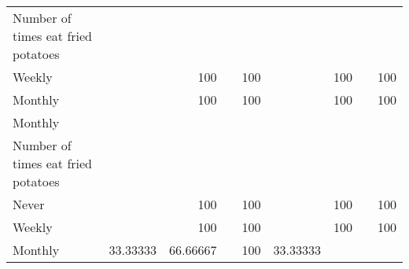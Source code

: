 \documentclass{article}
\begin{document}
\begin{tabular}{lllllllll}
\multicolumn{1}{l}{\hspace{6em}Number of times eat fried potatoes} &
  \multicolumn{1}{|r}{} &
  \multicolumn{1}{r}{} &
  \multicolumn{1}{r}{} &
  \multicolumn{1}{r}{} &
  \multicolumn{1}{r}{} &
  \multicolumn{1}{r}{} &
  \multicolumn{1}{r}{} &
  \multicolumn{1}{r}{} \\
\multicolumn{1}{l}{\hspace{7em}Weekly} &
  \multicolumn{1}{|r}{} &
  \multicolumn{1}{r}{100} &
  \multicolumn{1}{r}{} &
  \multicolumn{1}{r}{100} &
  \multicolumn{1}{r}{} &
  \multicolumn{1}{r}{100} &
  \multicolumn{1}{r}{} &
  \multicolumn{1}{r}{100} \\
\multicolumn{1}{l}{\hspace{7em}Monthly} &
  \multicolumn{1}{|r}{} &
  \multicolumn{1}{r}{100} &
  \multicolumn{1}{r}{} &
  \multicolumn{1}{r}{100} &
  \multicolumn{1}{r}{} &
  \multicolumn{1}{r}{100} &
  \multicolumn{1}{r}{} &
  \multicolumn{1}{r}{100} \\
\multicolumn{1}{l}{\hspace{5em}Monthly} &
  \multicolumn{1}{|r}{} &
  \multicolumn{1}{r}{} &
  \multicolumn{1}{r}{} &
  \multicolumn{1}{r}{} &
  \multicolumn{1}{r}{} &
  \multicolumn{1}{r}{} &
  \multicolumn{1}{r}{} &
  \multicolumn{1}{r}{} \\
\multicolumn{1}{l}{\hspace{6em}Number of times eat fried potatoes} &
  \multicolumn{1}{|r}{} &
  \multicolumn{1}{r}{} &
  \multicolumn{1}{r}{} &
  \multicolumn{1}{r}{} &
  \multicolumn{1}{r}{} &
  \multicolumn{1}{r}{} &
  \multicolumn{1}{r}{} &
  \multicolumn{1}{r}{} \\
\multicolumn{1}{l}{\hspace{7em}Never} &
  \multicolumn{1}{|r}{} &
  \multicolumn{1}{r}{100} &
  \multicolumn{1}{r}{} &
  \multicolumn{1}{r}{100} &
  \multicolumn{1}{r}{} &
  \multicolumn{1}{r}{100} &
  \multicolumn{1}{r}{} &
  \multicolumn{1}{r}{100} \\
\multicolumn{1}{l}{\hspace{7em}Weekly} &
  \multicolumn{1}{|r}{} &
  \multicolumn{1}{r}{100} &
  \multicolumn{1}{r}{} &
  \multicolumn{1}{r}{100} &
  \multicolumn{1}{r}{} &
  \multicolumn{1}{r}{100} &
  \multicolumn{1}{r}{} &
  \multicolumn{1}{r}{100} \\
\multicolumn{1}{l}{\hspace{7em}Monthly} &
  \multicolumn{1}{|r}{33.33333} &
  \multicolumn{1}{r}{66.66667} &
  \multicolumn{1}{r}{} &
  \multicolumn{1}{r}{100} &
  \multicolumn{1}{r}{33.33333} &

\end{tabular}
\end{document}

